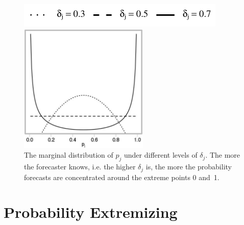 \documentclass[11pt]{article}
\theoremstyle{definition}
\theoremstyle{definition}
\begin{document}
\begin{figure}[t]
\centering
	\hspace{0em}\includegraphics{LegendMarginal}

 \includegraphics[width= 0.55\textwidth]{Marginals}
   \caption{The marginal distribution of $p_j$ under different levels of 
$\delta_j$.  The more the forecaster knows, i.e. the higher $\delta_j$ is, 
the more the probability forecasts are concentrated around the extreme 
points 0 and~1.}
\label{marginals}
\end{figure}

\section{Probability Extremizing}
\label{extremizing}
\end{document}
